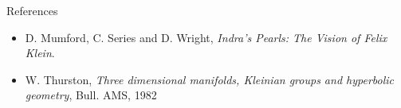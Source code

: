 \documentclass{beamer}
\begin{document}
\frame
{
\begin{block}{References}
\begin{itemize}
\item{D. Mumford, C. Series and D. Wright, {\em Indra's Pearls: The Vision of Felix Klein}.}
\item{W. Thurston, {\em Three dimensional manifolds, Kleinian groups and hyperbolic geometry},
Bull. AMS, 1982}
\end{itemize}
\end{block}
}
\end{document}
